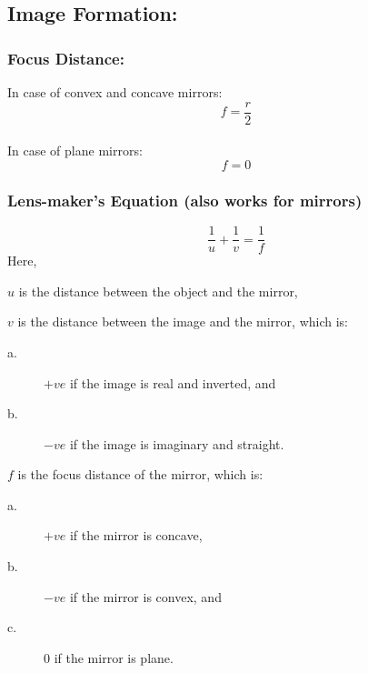 \documentclass[a4paper]{report}
\begin{document}
    \subsection{Image Formation: }
        \subsubsection{Focus Distance: }
            In case of convex and concave mirrors:
            \begin{equation}
                f = \frac{r}{2}
            \end{equation}
            \\
            In case of plane mirrors:
            \begin{equation}
                f = 0
            \end{equation}
        \subsubsection{Lens-maker's Equation (also works for mirrors)}
            \begin{equation}
                \frac{1}{u} + \frac{1}{v} = \frac{1}{f}
            \end{equation}
            Here,
            \begin{description}
                \item $u$ is the distance between the object and the mirror,
                \item $v$ is the distance between the image and the mirror, which is:
                    \begin{description}
                        \item[a.] $+ve$ if the image is real and inverted, and
                        \item[b.] $-ve$ if the image is imaginary and straight. 
                    \end{description}
                \item $f$ is the focus distance of the mirror, which is:
                    \begin{description}
                        \item[a.] $+ve$ if the mirror is concave,
                        \item[b.] $-ve$ if the mirror is convex, and
                        \item[c.] $0$ if the mirror is plane.
                    \end{description}
            \end{description}
\end{document}
